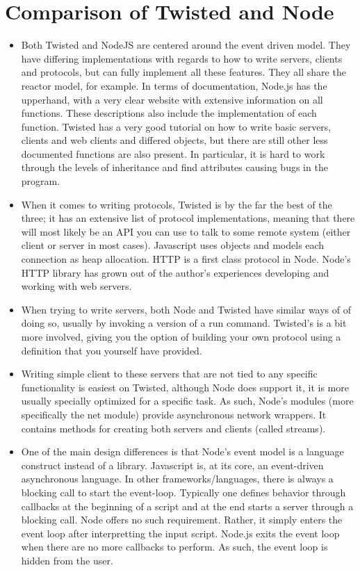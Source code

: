 \documentclass[letterpaper,twocolumn,10pt]{article}
\begin{document}
\section{Comparison of Twisted and Node}

\begin{itemize}
\item
Both Twisted and NodeJS are centered around the event driven model. They have differing implementations with regards to how to write servers, clients and protocols, but can fully implement all these features. They all share the reactor model, for example. In terms of documentation, Node.js has the upperhand, with a very clear website with extensive information on all functions. These descriptions also include the implementation of each function. Twisted has a very good tutorial on how to write basic servers, clients and web clients and differed objects, but there are still other less documented functions are also present. In particular, it is hard to work through the levels of inheritance and find attributes causing bugs in the program.
\item
When it comes to writing protocols, Twisted is by the far the best of the three; it has an extensive list of protocol implementations, meaning that there will most likely be an API you can use to talk to some remote system (either client or server in most cases). Javascript uses objects and models each connection as heap allocation. HTTP is a first class protocol in Node. Node's HTTP library has grown out of the author's experiences developing and working with web servers.
\item
When trying to write servers, both Node and Twisted have similar ways of of doing so, usually by invoking a version of a run command. Twisted’s is a bit more involved, giving you the option of building your own protocol using a definition that you yourself have provided. 
\item
Writing simple client to these servers that are not tied to any specific functionality is easiest on Twisted, although Node does support it, it is more usually specially optimized for a specific task. As such, Node’s modules (more specifically the net module) provide asynchronous network wrappers. It contains methods for creating both servers and clients (called streams). 
\item
One of the main design differences is that Node's event model is a language construct instead of a library. Javascript is, at its core, an event-driven asynchronous language. In other frameworks/languages, there is always a blocking call to start the event-loop. Typically one defines behavior through callbacks at the beginning of a script and at the end starts a server through a blocking call. Node offers no such requirement. Rather, it simply enters the event loop after interpretting the input script. Node.js exits the event loop when there are no more callbacks to perform. As such, the event loop is hidden from the user.

\end{itemize}
\end{document}
